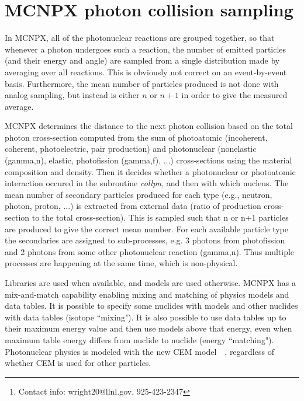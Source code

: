 \documentclass[fleqn,11pt]{article}
\date{October 24, 2008}
\author{
Jerome M. Verbeke, Doug Wright%
\footnote{Contact info: wright20@llnl.gov, 925-423-2347}\\
\\
Lawrence Livermore National Laboratory
}
\begin{document}
\maketitle


\section{MCNPX photon collision sampling}
In MCNPX, all of the photonuclear reactions are grouped together, so that whenever
a photon undergoes such a reaction, the number of emitted particles (and their energy and angle)
are sampled from a single distribution made by averaging over all reactions. This is obviously not correct on an event-by-event basis. Furthermore, the
mean number of particles produced is not done with analog sampling, but instead is either $n$ or $n+1$ in order
to give the measured average. 

MCNPX determines the distance to the next photon collision based 
on the total photon cross-section computed from the sum of 
photoatomic (incoherent, coherent, photoelectric, pair 
production) and photonuclear (nonelastic (gamma,n), elastic, 
photofission (gamma,f), ...) cross-sections using the material 
composition and density. Then it decides whether a photonuclear 
or photoatomic interaction occured in the subroutine \textit{collpn}, 
and then with which nucleus. The mean number of secondary 
particles produced for each type (e.g., neutron, photon, 
proton, ...) is extracted from external data (ratio of 
production cross-section to the total cross-section). This 
is sampled such that n or n+1 particles are produced to 
give the correct mean number.
For each available particle type the secondaries are assigned to
sub-processes, e.g. 3 photons from photofission and 2 photons from
some other photonuclear reaction (gamma,n). Thus multiple processes
are happening at the same time, which is non-physical.

Libraries are used when available, and models are used otherwise.
MCNPX has a mix-and-match capability enabling mixing and matching
of physics models and data tables. It is possible to specify some
nuclides with models and other nuclides with data tables (isotope
``mixing"). It is also possible to use data tables up to their
maximum energy value and then use models above that energy, even
when maximum table energy differs from nuclide to nuclide
(energy ``matching"). Photonuclear physics is modeled with the new
CEM model~\cite{Mashnik 2001}~\cite{Mashnik 2008}, regardless of 
whether CEM is used for other particles.
\end{document}
